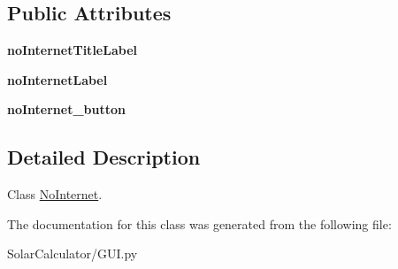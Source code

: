 \subsection*{Public Attributes}
\begin{DoxyCompactItemize}
\item 
\hypertarget{class_solar_calculator_1_1_g_u_i_1_1_no_internet_a22fe40ada4402c19fcb33fea504252bc}{{\bfseries no\-Internet\-Title\-Label}}\label{class_solar_calculator_1_1_g_u_i_1_1_no_internet_a22fe40ada4402c19fcb33fea504252bc}

\item 
\hypertarget{class_solar_calculator_1_1_g_u_i_1_1_no_internet_a38606d02faa2600d41c73cef6865088a}{{\bfseries no\-Internet\-Label}}\label{class_solar_calculator_1_1_g_u_i_1_1_no_internet_a38606d02faa2600d41c73cef6865088a}

\item 
\hypertarget{class_solar_calculator_1_1_g_u_i_1_1_no_internet_a9af04530927ffbb74c3f85f9ac1c445b}{{\bfseries no\-Internet\-\_\-button}}\label{class_solar_calculator_1_1_g_u_i_1_1_no_internet_a9af04530927ffbb74c3f85f9ac1c445b}

\end{DoxyCompactItemize}


\subsection{Detailed Description}
Class \hyperlink{class_solar_calculator_1_1_g_u_i_1_1_no_internet}{No\-Internet}. 

The documentation for this class was generated from the following file\-:\begin{DoxyCompactItemize}
\item 
Solar\-Calculator/G\-U\-I.\-py\end{DoxyCompactItemize}
